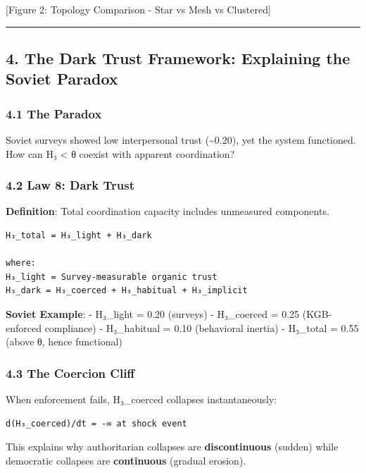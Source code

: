 \documentclass[11pt,letterpaper]{article}
\begin{document}
{[}Figure 2: Topology Comparison - Star vs Mesh vs Clustered{]}

\begin{center}\rule{0.5\linewidth}{0.5pt}\end{center}

\subsection{4. The Dark Trust Framework: Explaining the Soviet
Paradox}\label{the-dark-trust-framework-explaining-the-soviet-paradox}

\subsubsection{4.1 The Paradox}\label{the-paradox-1}

Soviet surveys showed low interpersonal trust (\textasciitilde0.20), yet
the system functioned. How can H₃ \textless{} θ coexist with apparent
coordination?

\subsubsection{4.2 Law 8: Dark Trust}\label{law-8-dark-trust}

\textbf{Definition}: Total coordination capacity includes unmeasured
components.

\begin{verbatim}
H₃_total = H₃_light + H₃_dark

where:
H₃_light = Survey-measurable organic trust
H₃_dark = H₃_coerced + H₃_habitual + H₃_implicit
\end{verbatim}

\textbf{Soviet Example}: - H₃\_light = 0.20 (surveys) - H₃\_coerced =
0.25 (KGB-enforced compliance) - H₃\_habitual = 0.10 (behavioral
inertia) - H₃\_total = 0.55 (above θ, hence functional)

\subsubsection{4.3 The Coercion Cliff}\label{the-coercion-cliff}

When enforcement fails, H₃\_coerced collapses instantaneously:

\begin{verbatim}
d(H₃_coerced)/dt = -∞ at shock event
\end{verbatim}

This explains why authoritarian collapses are \textbf{discontinuous}
(sudden) while democratic collapses are \textbf{continuous} (gradual
erosion).
\end{document}
